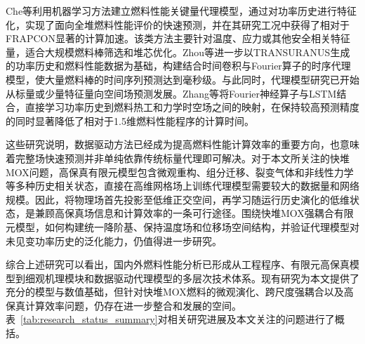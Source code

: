 Che等\cite{cheMachineLearningAssistedSurrogate2022}利用机器学习方法建立燃料性能关键量代理模型，通过对功率历史进行特征化，实现了面向全堆燃料性能评价的快速预测，并在其研究工况中获得了相对于FRAPCON显著的计算加速。该类方法主要针对温度、应力或其他安全相关特征量，适合大规模燃料棒筛选和堆芯优化。Zhou等\cite{zhouDeepHeterogeneousJoint2025}进一步以TRANSURANUS生成的功率历史和燃料性能数据为基础，构建结合时间卷积与Fourier算子的时序代理模型，使大量燃料棒的时间序列预测达到毫秒级。与此同时，代理模型研究已开始从标量或少量特征量向空间场预测发展。Zhang等\cite{zhangLearningSimulateQuasiSteady2025}将Fourier神经算子与LSTM结合，直接学习功率历史到燃料热工和力学时空场之间的映射，在保持较高预测精度的同时显著降低了相对于1.5维燃料性能程序的计算时间。

这些研究说明，数据驱动方法已经成为提高燃料性能计算效率的重要方向，也意味着完整场快速预测并非单纯依靠传统标量代理即可解决。对于本文所关注的快堆MOX问题，高保真有限元模型包含微观重构、组分迁移、裂变气体和非线性力学等多种历史相关状态，直接在高维网格场上训练代理模型需要较大的数据量和网络规模。因此，将物理场首先投影至低维正交空间，再学习随运行历史演化的低维状态，是兼顾高保真场信息和计算效率的一条可行途径。围绕快堆MOX强耦合有限元模型，如何构建统一降阶基、保持温度场和位移场空间结构，并验证代理模型对未见变功率历史的泛化能力，仍值得进一步研究。


综合上述研究可以看出，国内外燃料性能分析已形成从工程程序、有限元高保真模型到细观机理模块和数据驱动代理模型的多层次技术体系。现有研究为本文提供了充分的模型与数值基础，但针对快堆MOX燃料的微观演化、跨尺度强耦合以及高保真计算效率问题，仍存在进一步整合和发展的空间。表~\ref{tab:research_status_summary}对相关研究进展及本文关注的问题进行了概括。


